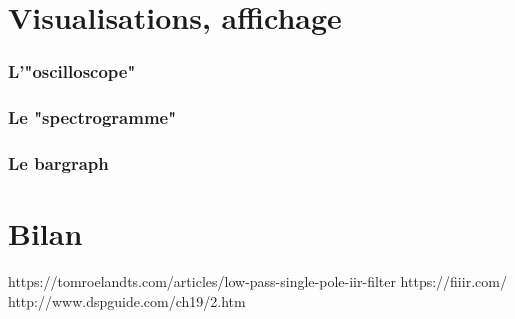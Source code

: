 \documentclass[hidelinks]{article}
\begin{document}
    \part{Visualisations, affichage}
    \section{L'"oscilloscope"}
    \section{Le "spectrogramme"}
    \section{Le bargraph}
    \part*{Bilan}
  
\newpage
https://tomroelandts.com/articles/low-pass-single-pole-iir-filter
https://fiiir.com/
http://www.dspguide.com/ch19/2.htm
\end{document}
